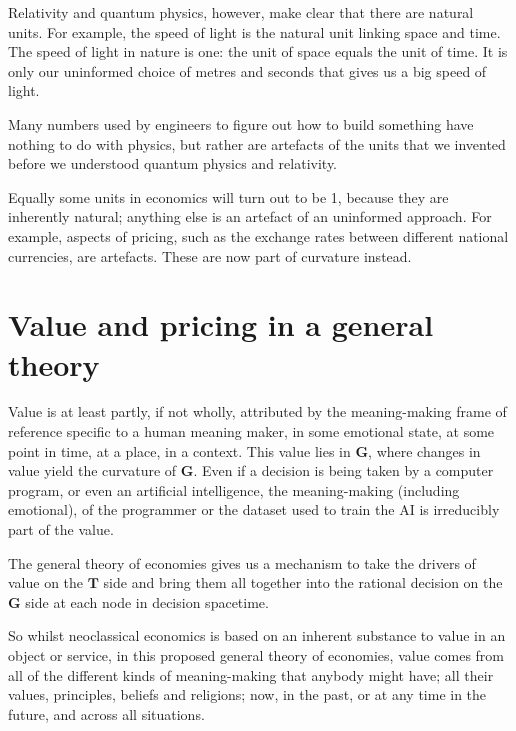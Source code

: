 Relativity  and quantum physics, however, make clear that there are natural units. For example, the speed of light is the natural unit linking space and time. The speed of light in nature is one: the unit of space equals the unit of time. It is only our uninformed choice of metres and seconds that gives us a big speed of light.


Many numbers used by engineers to figure out how to build something have nothing to do with physics, but rather are artefacts of the units that we invented before we understood quantum physics and relativity. 


Equally some units in economics will turn out to be 1, because they are inherently natural; anything else is an artefact of an uninformed approach. For example, aspects of pricing, such as the exchange rates between different national currencies, are artefacts. These are now part of curvature instead.




\section*{Value and pricing in a general theory}
Value is at least partly, if not wholly, attributed by the meaning\hyp{}making frame of reference  specific to a human meaning maker, in some emotional state, at some point in time, at a place, in a context. This value lies in $\mathbf{G}$, where changes in value yield the curvature of $\mathbf{G}$. Even if a decision is being taken by a computer program, or even an artificial intelligence, the meaning\hyp{}making (including emotional), of the programmer or the dataset used to train the AI is irreducibly part of the value.


The general theory of economies gives us a mechanism to take the drivers of value\cite{mason-post-capitalism} on the $\mathbf{T}$ side and bring them all together into the rational decision on the $\mathbf{G}$ side at each node in decision spacetime.


So whilst neoclassical economics is based on an inherent substance to value in an object or service, in this proposed general theory of economies, value comes from all of the different kinds of meaning\hyp{}making that anybody might have; all their values, principles, beliefs and religions; now, in the past, or at any time in the future, and across all situations.


